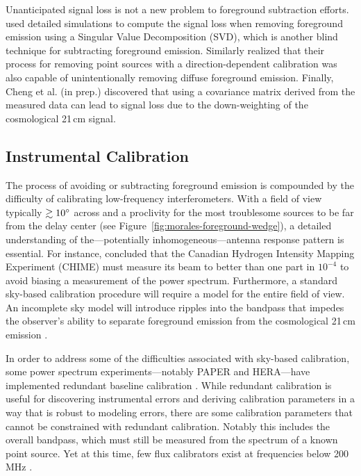 \begin{bibunit}
Unanticipated signal loss is not a new problem to foreground subtraction efforts.
\citet{2013MNRAS.433..639P} used detailed simulations to compute the signal loss when removing
foreground emission using a Singular Value Decomposition (SVD), which is another blind technique for
subtracting foreground emission. Similarly \citet{2016MNRAS.463.4317P} realized that their process
for removing point sources with a direction-dependent calibration was also capable of
unintentionally removing diffuse foreground emission. Finally, Cheng et al. (in prep.) discovered
that using a covariance matrix derived from the measured data can lead to signal loss due to the
down-weighting of the cosmological 21\,cm signal.

\subsection{Instrumental Calibration}

The process of avoiding or subtracting foreground emission is compounded by the difficulty of
calibrating low-frequency interferometers.  With a field of view typically $\gtrsim10\mbox{$^\circ$}$ across
and a proclivity for the most troublesome sources to be far from the delay center (see
Figure~\ref{fig:morales-foreground-wedge}), a detailed understanding of the---potentially
inhomogeneous---antenna response pattern is essential.  For instance, \citet{2015PhRvD..91h3514S}
concluded that the Canadian Hydrogen Intensity Mapping Experiment (CHIME) must measure its beam to
better than one part in $10^{-4}$ to avoid biasing a measurement of the power spectrum.
Furthermore, a standard sky-based calibration procedure will require a model for the entire field of
view. An incomplete sky model will introduce ripples into the bandpass that impedes the observer's
ability to separate foreground emission from the cosmological 21\,cm emission \citep[e.g.,
Figure~\ref{fig:morales-foreground-wedge};][]{2016MNRAS.461.3135B, 2017MNRAS.470.1849E}.

In order to address some of the difficulties associated with sky-based calibration, some power
spectrum experiments---notably PAPER and HERA---have implemented redundant baseline calibration
\citep{2010MNRAS.408.1029L}. While redundant calibration is useful for discovering instrumental
errors and deriving calibration parameters in a way that is robust to modeling errors, there are
some calibration parameters that cannot be constrained with redundant calibration.  Notably this
includes the overall bandpass, which must still be measured from the spectrum of a known point
source. Yet at this time, few flux calibrators exist at frequencies below 200\,MHz
\citep{2012MNRAS.423L..30S, 2017ApJS..230....7P}.


\end{bibunit}
